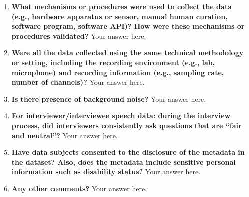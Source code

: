 \documentclass{article}
\begin{document}
    \noindent{}
    \begin{enumerate}[leftmargin=0.65cm]
        \scriptsize
      
        \item \textbf{What mechanisms or procedures were used to collect the data (e.g., hardware apparatus or sensor, manual human curation, software program, software API)? How were these mechanisms or procedures validated?}
        \newline 
        Your answer here.
        \newline 
        
        \item \textbf{Were all the data collected using the same technical methodology or setting, including the recording environment (e.g., lab, microphone) and recording information (e.g., sampling rate, number of channels)?}
        \newline 
        Your answer here.
        \newline 
       
        \item \textbf{Is there presence of background noise?} 
        \newline 
        Your answer here.
        \newline 
        
        \item \textbf{For interviewer/interviewee speech data: during the interview process, did interviewers consistently ask questions that are ``fair and neutral''?}
        \newline 
        Your answer here.
        \newline 
        
        \item \textbf{Have data subjects consented to the disclosure of the metadata in the dataset? Also, does the metadata include sensitive personal information such as disability status?}
        \newline 
        Your answer here.
        \newline 
          
        \item \textbf{Any other comments?}
        \newline 
        Your answer here.
        \newline 
    \end{enumerate}
\end{document}
